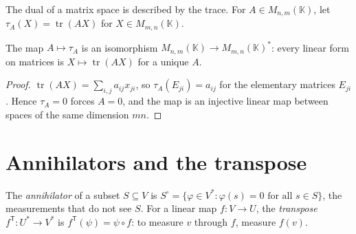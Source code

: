 The dual of a matrix space is described by the trace. For $A\in M_{n,m}(\mathbb K)$, let $\tau_A(X)=\operatorname{tr}(AX)$
for $X\in M_{m,n}(\mathbb K)$.

\begin{proposition}\label{prop:trace}
The map $A\mapsto\tau_A$ is an isomorphism $M_{n,m}(\mathbb K)\to M_{m,n}(\mathbb K)^*$: every linear form on matrices is
$X\mapsto\operatorname{tr}(AX)$ for a unique $A$.
\end{proposition}
\begin{proof}
$\operatorname{tr}(AX)=\sum_{i,j}a_{ij}x_{ji}$, so $\tau_A(E_{ji})=a_{ij}$ for the elementary matrices $E_{ji}$. Hence
$\tau_A=0$ forces $A=0$, and the map is an injective linear map between spaces of the same dimension $mn$.
\end{proof}

\section{Annihilators and the transpose}\label{sec:transpose}

\begin{definition}
The \emph{annihilator} of a subset $S\subseteq V$ is $S^\circ=\{\varphi\in V^*:\varphi(s)=0\text{ for all }s\in S\}$, the
measurements that do not see $S$. For a linear map $f:V\to U$, the \emph{transpose} $f^{\mathsf T}:U^*\to V^*$ is
$f^{\mathsf T}(\psi)=\psi\circ f$: to measure $v$ through $f$, measure $f(v)$.
\end{definition}

